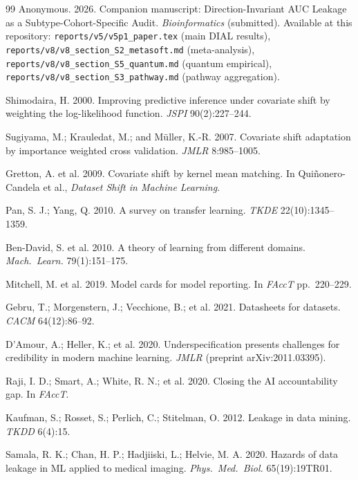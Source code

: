 \documentclass[letterpaper,11pt]{article}
\begin{document}
\begin{thebibliography}{99}
Anonymous. 2026. Companion manuscript: Direction-Invariant AUC Leakage
 as a Subtype-Cohort-Specific Audit. \emph{Bioinformatics} (submitted).
 Available at this repository:
 \texttt{reports/v5/v5p1\_paper.tex} (main DIAL results),
 \texttt{reports/v8/v8\_section\_S2\_metasoft.md} (meta-analysis),
 \texttt{reports/v8/v8\_section\_S5\_quantum.md} (quantum empirical),
 \texttt{reports/v8/v8\_section\_S3\_pathway.md} (pathway aggregation).

Shimodaira, H. 2000. Improving predictive inference under covariate
 shift by weighting the log-likelihood function. \emph{JSPI}
 90(2):227--244.

Sugiyama, M.; Krauledat, M.; and M\"uller, K.-R. 2007. Covariate
 shift adaptation by importance weighted cross validation. \emph{JMLR}
 8:985--1005.

Gretton, A. et al. 2009. Covariate shift by kernel mean matching.
 In Qui\~{n}onero-Candela et al., \emph{Dataset Shift in Machine
 Learning}.

Pan, S. J.; Yang, Q. 2010. A survey on transfer learning. \emph{TKDE}
 22(10):1345--1359.

Ben-David, S. et al. 2010. A theory of learning from different
 domains. \emph{Mach.\ Learn.} 79(1):151--175.

Mitchell, M. et al. 2019. Model cards for model reporting. In
 \emph{FAccT} pp.~220--229.

Gebru, T.; Morgenstern, J.; Vecchione, B.; et al. 2021. Datasheets
 for datasets. \emph{CACM} 64(12):86--92.

D'Amour, A.; Heller, K.; et al. 2020. Underspecification presents
 challenges for credibility in modern machine learning. \emph{JMLR}
 (preprint arXiv:2011.03395).

Raji, I. D.; Smart, A.; White, R. N.; et al. 2020. Closing the AI
 accountability gap. In \emph{FAccT}.

Kaufman, S.; Rosset, S.; Perlich, C.; Stitelman, O. 2012. Leakage in
 data mining. \emph{TKDD} 6(4):15.

Samala, R. K.; Chan, H. P.; Hadjiiski, L.; Helvie, M. A. 2020.
 Hazards of data leakage in ML applied to medical imaging.
 \emph{Phys.\ Med.\ Biol.} 65(19):19TR01.


\end{thebibliography}
\end{document}
